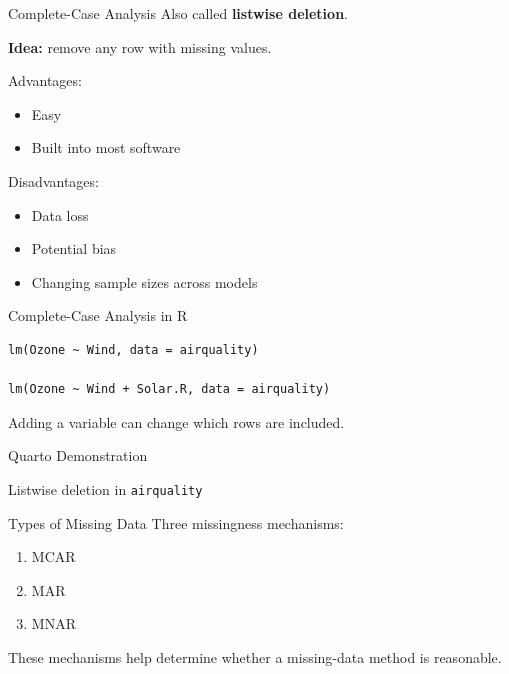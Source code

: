 \documentclass{beamer}
\begin{document}
\begin{frame}{Complete-Case Analysis}
Also called \textbf{listwise deletion}.

\vspace{0.3cm}

\textbf{Idea:} remove any row with missing values.

\vspace{0.3cm}

Advantages:
\begin{itemize}
  \item Easy
  \item Built into most software
\end{itemize}

Disadvantages:
\begin{itemize}
  \item Data loss
  \item Potential bias
  \item Changing sample sizes across models
\end{itemize}
\end{frame}

\begin{frame}[fragile]{Complete-Case Analysis in R}
\begin{verbatim}
lm(Ozone ~ Wind, data = airquality)

lm(Ozone ~ Wind + Solar.R, data = airquality)
\end{verbatim}

\vspace{0.4cm}

Adding a variable can change which rows are included.
\end{frame}

\begin{frame}[plain]
\centering
\vfill
{\Huge Quarto Demonstration}

\vspace{0.5cm}

{\Large Listwise deletion in \texttt{airquality}}

\vfill
\end{frame}

\begin{frame}{Types of Missing Data}
Three missingness mechanisms:

\begin{enumerate}
  \item MCAR
  \item MAR
  \item MNAR
\end{enumerate}

\vspace{0.4cm}

These mechanisms help determine whether a missing-data method is reasonable.
\end{frame}
\end{document}
